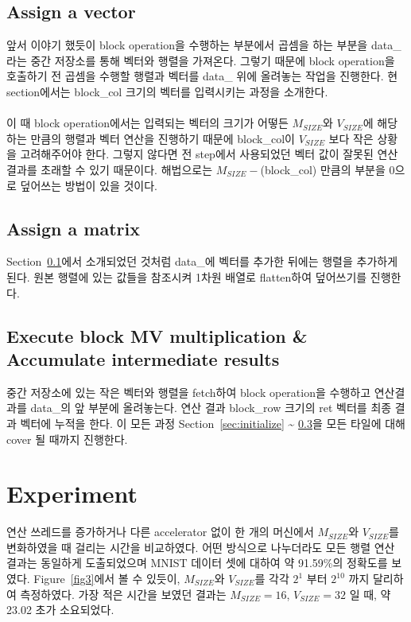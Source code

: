 \documentclass{article}
\begin{document}
\subsection{Assign a vector}
\label{sec:vector}
앞서 이야기 했듯이 block operation을 수행하는 부분에서 곱셈을 하는 부분을 data\_라는 중간 저장소를 통해 벡터와 행렬을 가져온다. 그렇기 때문에 block operation을 호출하기 전 곱셈을 수행할 행렬과 벡터를 data\_ 위에 올려놓는 작업을 진행한다. 현 section에서는 block\_col 크기의 벡터를 입력시키는 과정을 소개한다.\\
\\
이 때 block operation에서는 입력되는 벡터의 크기가 어떻든 $M_{SIZE}$와 $V_{SIZE}$에 해당하는 만큼의 행렬과 벡터 연산을 진행하기 때문에 block\_col이 $V_{SIZE}$ 보다 작은 상황을 고려해주어야 한다. 그렇지 않다면 전 step에서 사용되었던 벡터 값이 잘못된 연산 결과를 초래할 수 있기 때문이다. 해법으로는 $M_{SIZE} -$(block\_col) 만큼의 부분을 0으로 덮어쓰는 방법이 있을 것이다.

\subsection{Assign a matrix}
Section~\ref{sec:vector}에서 소개되었던 것처럼 data\_에 벡터를 추가한 뒤에는 행렬을 추가하게 된다. 원본 행렬에 있는 값들을 참조시켜 1차원 배열로 flatten하여 덮어쓰기를 진행한다.

\subsection{Execute block MV multiplication \& Accumulate intermediate results}
\label{sec:accumulate}
중간 저장소에 있는 작은 벡터와 행렬을 fetch하여 block operation을 수행하고 연산결과를 data\_의 앞 부분에 올려놓는다.
연산 결과 block\_row 크기의 ret 벡터를 최종 결과 벡터에 누적을 한다.  이 모든 과정 Section~\ref{sec:initialize} \~{} \ref{sec:accumulate}을 모든 타일에 대해 cover 될 때까지 진행한다.


\section{Experiment}
연산 쓰레드를 증가하거나 다른 accelerator 없이 한 개의 머신에서 $M_{SIZE}$와 $V_{SIZE}$를 변화하였을 때 걸리는 시간을 비교하였다. 어떤 방식으로 나누더라도 모든 행렬 연산 결과는 동일하게 도출되었으며 MNIST 데이터 셋에 대하여 약 91.59\%의 정확도를 보였다. Figure~\ref{fig3}에서 볼 수 있듯이, $M_{SIZE}$와 $V_{SIZE}$를 각각 $2^1$ 부터  $2^{10}$ 까지 달리하여 측정하였다. 가장 적은 시간을 보였던 결과는 $M_{SIZE}=16$, $V_{SIZE}=32$ 일 때, 약 23.02 초가 소요되었다.
\end{document}
